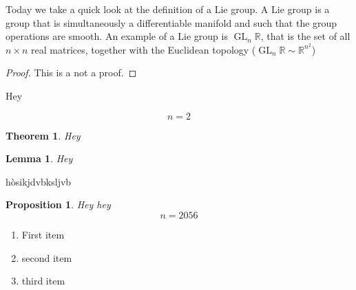 \documentclass[a4paper, 12pt]{article}
\theoremstyle{definition}
\theoremstyle{plain}
\newtheorem{theorem}[definition]{Theorem}
\newtheorem{proposition}[definition]{Proposition}
\newtheorem{lemma}[definition]{Lemma}
\theoremstyle{remark}
\begin{document}
Today we take a quick look at the definition of a Lie group. A Lie group is a group that is simultaneously a differentiable manifold and such that the group operations are smooth. An example of a Lie group is \( \operatorname{GL}_n \mathbb{R} \), that is the set of all \( n \times n \) real matrices, together with the Euclidean topology (\( \operatorname{GL}_n \mathbb{R} \sim \mathbb{R}^{n^2} \))

\begin{proof}
    This is a not a proof.
\end{proof}

Hey

\begin{equation}
    n = 2
\end{equation}

\begin{theorem}
    Hey
\end{theorem}

\begin{lemma}
    Hey
\end{lemma}

hòsikjdvbksljvb

\begin{proposition}
    Hey hey
    \begin{equation}
        n = 2056
    \end{equation}
\end{proposition}

\begin{enumerate}
    \item First item
    \item second item
    \item third item
\end{enumerate}
\end{document}
